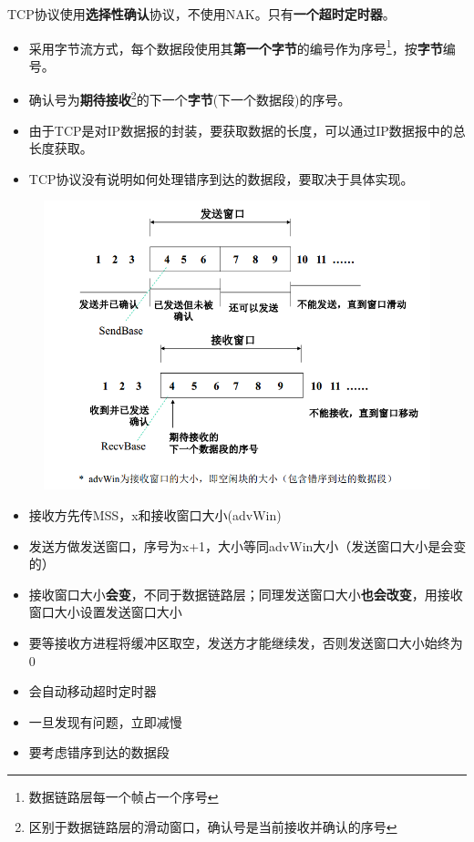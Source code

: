 TCP协议使用\textbf{选择性确认}协议，不使用NAK。只有\textbf{一个超时定时器}。
\begin{itemize}
\item 采用字节流方式，每个数据段使用其\textbf{第一个字节}的编号作为序号\footnote{数据链路层每一个帧占一个序号}，按\textbf{字节}编号。
\item 确认号为\textbf{期待接收}\footnote{区别于数据链路层的滑动窗口，确认号是当前接收并确认的序号}的下一个\textbf{字节}(下一个数据段)的序号。
\item 由于TCP是对IP数据报的封装，要获取数据的长度，可以通过IP数据报中的总长度获取。
\item TCP协议没有说明如何处理错序到达的数据段，要取决于具体实现。
\end{itemize}

\begin{figure}[H]
    \centering
    \includegraphics[width=0.8\linewidth]{fig/TCP-window.PNG}
\end{figure}

\begin{itemize}
\item 接收方先传MSS，x和接收窗口大小(advWin)
\item 发送方做发送窗口，序号为x+1，大小等同advWin大小（发送窗口大小是会变的）
\item 接收窗口大小\textbf{会变}，不同于数据链路层；同理发送窗口大小\textbf{也会改变}，用接收窗口大小设置发送窗口大小
\item 要等接收方进程将缓冲区取空，发送方才能继续发，否则发送窗口大小始终为0
\item 会自动移动超时定时器
\item 一旦发现有问题，立即减慢
\item 要考虑错序到达的数据段
\end{itemize}

